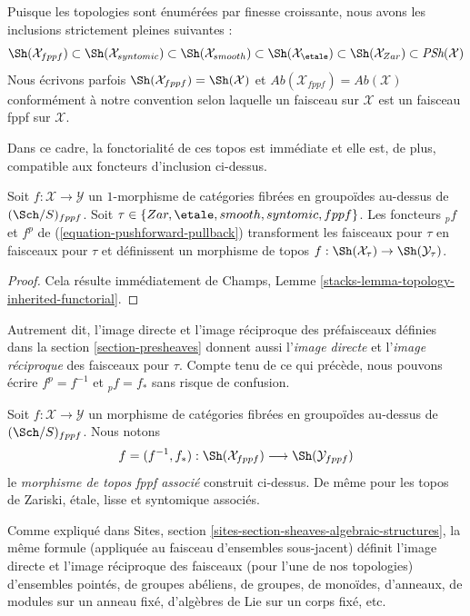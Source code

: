\medskip\noindent
Puisque les topologies sont énumérées par finesse croissante, nous avons
les inclusions strictement pleines suivantes :
$$
\Sh(\mathcal{X}_{fppf}) \subset
\Sh(\mathcal{X}_{syntomic}) \subset
\Sh(\mathcal{X}_{smooth}) \subset
\Sh(\mathcal{X}_\etale) \subset
\Sh(\mathcal{X}_{Zar}) \subset \textit{PSh}(\mathcal{X})
$$
Nous écrivons parfois
$\Sh(\mathcal{X}_{fppf}) = \Sh(\mathcal{X})$
et
$\textit{Ab}(\mathcal{X}_{fppf}) = \textit{Ab}(\mathcal{X})$
conformément à notre convention selon laquelle un faisceau sur $\mathcal{X}$
est un faisceau fppf sur $\mathcal{X}$.

\medskip\noindent
Dans ce cadre, la fonctorialité de ces topos est immédiate et
elle est, de plus, compatible aux foncteurs d'inclusion ci-dessus.

\begin{lemma}
\label{lemma-functoriality-sheaves}
Soit $f : \mathcal{X} \to \mathcal{Y}$ un $1$-morphisme de catégories
fibrées en groupoïdes au-dessus de $(\Sch/S)_{fppf}$. Soit
$\tau \in \{Zar, \etale, smooth, syntomic, fppf\}$.
Les foncteurs ${}_pf$ et $f^p$ de (\ref{equation-pushforward-pullback})
transforment les faisceaux pour $\tau$ en faisceaux pour $\tau$ et définissent un morphisme
de topos
$f : \Sh(\mathcal{X}_\tau) \to \Sh(\mathcal{Y}_\tau)$.
\end{lemma}

\begin{proof}
Cela résulte immédiatement de
Champs, Lemme \ref{stacks-lemma-topology-inherited-functorial}.
\end{proof}

\noindent
Autrement dit, l'image directe et l'image réciproque des préfaisceaux définies dans la
section \ref{section-presheaves}
donnent aussi l'{\it image directe} et l'{\it image réciproque} des faisceaux pour $\tau$.
Compte tenu de ce qui précède, nous pouvons écrire $f^p = f^{-1}$
et ${}_pf = f_*$ sans risque de confusion.

\begin{definition}
\label{definition-morphism}
Soit $f : \mathcal{X} \to \mathcal{Y}$ un morphisme de catégories
fibrées en groupoïdes au-dessus de $(\Sch/S)_{fppf}$. Nous notons
$$
f = (f^{-1}, f_*) :
\Sh(\mathcal{X}_{fppf})
\longrightarrow
\Sh(\mathcal{Y}_{fppf})
$$
le {\it morphisme de topos fppf associé} construit ci-dessus.
De même pour les topos de Zariski, \'etale, lisse et syntomique associés.
\end{definition}

\noindent
Comme expliqué dans
Sites, section \ref{sites-section-sheaves-algebraic-structures},
la même formule (appliquée au faisceau d'ensembles sous-jacent) définit
l'image directe et l'image réciproque des faisceaux (pour l'une de nos topologies)
d'ensembles pointés, de groupes abéliens, de groupes, de monoïdes, d'anneaux, de modules
sur un anneau fixé, d'algèbres de Lie sur un corps fixé, etc.








